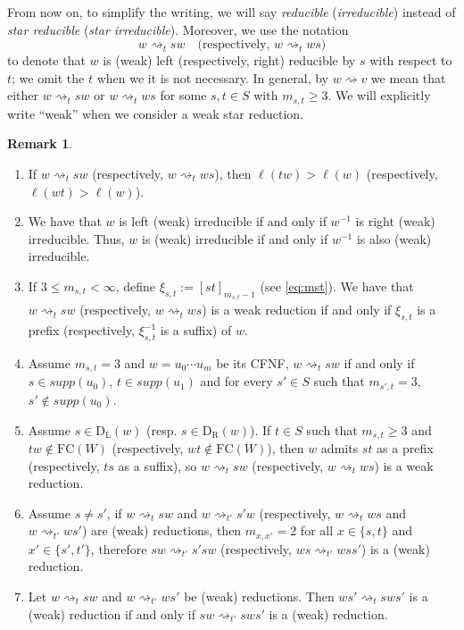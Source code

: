 \documentclass{amsart}
\newcommand{\ld}{{\mathrm{D}_{\mathrm{L}}}}
\newcommand{\rd}{{\mathrm{D}_{\mathrm{R}}}}
\newcommand{\fc}{{\mathrm{FC}}}
\newcommand{\red}{\rightsquigarrow}
\theoremstyle{definition}
\newtheorem{Remark}[Theorem]{Remark}
\begin{document}
From now on, to simplify the writing, we will say \textit{reducible} (\textit{irreducible}) instead of \textit{star reducible} (\textit{star irreducible}). Moreover, we use the notation $$w\red_t sw \quad\mbox{(respectively, } w\red_t ws)$$ to denote that $w$ is (weak) left (respectively, right) reducible by $s$ with respect to $t$; we omit the $t$ when we it is not necessary. In general, by $w\red v$ we mean that either $w\red_t sw$ or $w\red_t ws$ for some $s,t\in S$ with $m_{s,t}\ge 3$. We will explicitly write ``weak'' when we consider a weak star reduction.

\begin{Remark}\
\label{oss}

\begin{enumerate}
    \item[(1)] If $w\red_t sw$ (respectively, $w\red_t ws$), then $\ell(tw)>\ell(w)$ (respectively, $\ell(wt)>\ell(w)$).%
    \item[(2)] We have that $w$ is left (weak) irreducible if and only if $w^{-1}$ is right (weak) irreducible. Thus, $w$ is (weak) irreducible if and only if $w^{-1}$ is also (weak) irreducible.
    \item[(3)] If $3\le m_{s,t}<\infty$, define $\xi_{s,t} := [st]_{m_{s,t}-1}$ (see \eqref{eq:mst}). We have that $w\red_t sw$ (respectively, $w\red_t ws$) is a weak reduction if and only if $\xi_{s,t}$ is a prefix (respectively, $\xi_{s,t}^{-1}$ is a suffix) of $w$.    
    \item[(4)] Assume $m_{s,t}=3$ and $w=u_0\cdots u_m$ be its CFNF, $w\red_t sw$ if and only if $s\in supp(u_0)$, $t\in supp(u_1)$ and for every $s'\in S$ such that $m_{s',t}= 3$, $s'\notin supp(u_0)$. 
    \item[(5)] Assume $s\in \ld(w)$ (resp. $s\in \rd(w)$). If $t\in S$ such that $m_{s,t}\ge 3$ and $tw\notin \fc(W)$ (respectively, $wt\notin \fc(W)$), then $w$ admits $st$ as a prefix (respectively, $ts$ as a suffix), so $w\red_t sw$ (respectively, $w\red_t ws$) is a weak reduction. 
    \item[(6)] Assume $s\ne s'$, if $w\red_t sw$ and $w\red_{t'} s'w$ (respectively, $w\red_t ws$ and $w\red_{t'} ws'$) are (weak) reductions, then $m_{x,x'}=2$ for all $x\in \{s,t\}$ and $x'\in \{s',t'\}$, therefore $sw\red_{t'} s'sw$ (respectively, $ws \red_{t'} wss'$) is a (weak) reduction. 
    \item[(7)] %
    Let $w\red_t sw$ and $w\red_{t'} ws'$ be (weak) reductions. Then $ws'\red_t sws'$  is a (weak) reduction if and only if $sw \red_{t'} sws'$ is a (weak) reduction. 
\end{enumerate}
\end{Remark}
\end{document}
